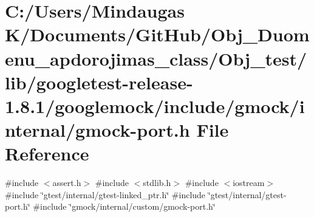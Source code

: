 \hypertarget{_obj__test_2lib_2googletest-release-1_88_81_2googlemock_2include_2gmock_2internal_2gmock-port_8h}{}\section{C\+:/\+Users/\+Mindaugas K/\+Documents/\+Git\+Hub/\+Obj\+\_\+\+Duomenu\+\_\+apdorojimas\+\_\+class/\+Obj\+\_\+test/lib/googletest-\/release-\/1.8.1/googlemock/include/gmock/internal/gmock-\/port.h File Reference}
\label{_obj__test_2lib_2googletest-release-1_88_81_2googlemock_2include_2gmock_2internal_2gmock-port_8h}
{\ttfamily \#include $<$assert.\+h$>$}\newline
{\ttfamily \#include $<$stdlib.\+h$>$}\newline
{\ttfamily \#include $<$iostream$>$}\newline
{\ttfamily \#include \char`\"{}gtest/internal/gtest-\/linked\+\_\+ptr.\+h\char`\"{}}\newline
{\ttfamily \#include \char`\"{}gtest/internal/gtest-\/port.\+h\char`\"{}}\newline
{\ttfamily \#include \char`\"{}gmock/internal/custom/gmock-\/port.\+h\char`\"{}}\newline
